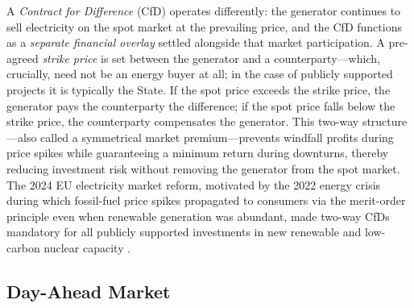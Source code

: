 A \textit{Contract for Difference} (CfD) operates differently: the generator continues to sell electricity on the spot market at the prevailing price, and the CfD functions as a \textit{separate financial overlay} settled alongside that market participation. A pre-agreed \textit{strike price} is set between the generator and a counterparty---which, crucially, need not be an energy buyer at all; in the case of publicly supported projects it is typically the State. If the spot price exceeds the strike price, the generator pays the counterparty the difference; if the spot price falls below the strike price, the counterparty compensates the generator. This two-way structure---also called a symmetrical market premium---prevents windfall profits during price spikes while guaranteeing a minimum return during downturns, thereby reducing investment risk without removing the generator from the spot market. The 2024 EU electricity market reform, motivated by the 2022 energy crisis during which fossil-fuel price spikes propagated to consumers via the merit-order principle even when renewable generation was abundant, made two-way CfDs mandatory for all publicly supported investments in new renewable and low-carbon nuclear capacity \cite{[search: EU electricity market reform 2024 CfD mandatory renewable nuclear Council Regulation 2024]}.

\subsection{Day-Ahead Market}

